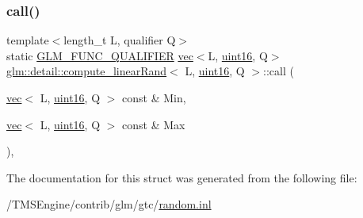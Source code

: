 \subsubsection{\texorpdfstring{call()}{call()}}
{\footnotesize\ttfamily template$<$length\+\_\+t L, qualifier Q$>$ \\
static \hyperlink{setup_8hpp_a33fdea6f91c5f834105f7415e2a64407}{G\+L\+M\+\_\+\+F\+U\+N\+C\+\_\+\+Q\+U\+A\+L\+I\+F\+I\+ER} \hyperlink{structglm_1_1vec}{vec}$<$L, \hyperlink{namespaceglm_1_1detail_a47b2a7d006d187338e8031a352d1ce56}{uint16}, Q$>$ \hyperlink{structglm_1_1detail_1_1compute__linear_rand}{glm\+::detail\+::compute\+\_\+linear\+Rand}$<$ L, \hyperlink{namespaceglm_1_1detail_a47b2a7d006d187338e8031a352d1ce56}{uint16}, Q $>$\+::call (\begin{DoxyParamCaption}\item[{\hyperlink{structglm_1_1vec}{vec}$<$ L, \hyperlink{namespaceglm_1_1detail_a47b2a7d006d187338e8031a352d1ce56}{uint16}, Q $>$ const \&}]{Min,  }\item[{\hyperlink{structglm_1_1vec}{vec}$<$ L, \hyperlink{namespaceglm_1_1detail_a47b2a7d006d187338e8031a352d1ce56}{uint16}, Q $>$ const \&}]{Max }\end{DoxyParamCaption})\hspace{0.3cm}{\ttfamily [inline]}, {\ttfamily [static]}}



The documentation for this struct was generated from the following file\+:\begin{DoxyCompactItemize}
\item 
/\+T\+M\+S\+Engine/contrib/glm/gtc/\hyperlink{random_8inl}{random.\+inl}\end{DoxyCompactItemize}
